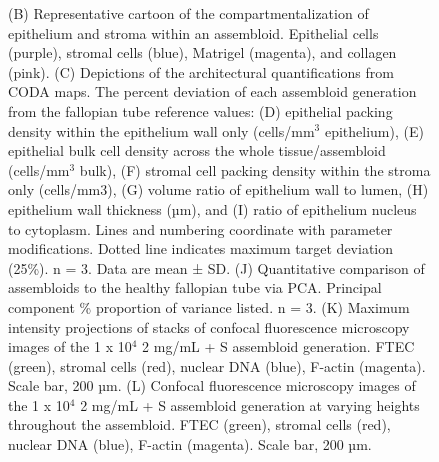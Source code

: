 \begin{refsection}
    \begin{figure}[h!]
        \ContinuedFloat
        \captionsetup{font=small}
        \caption[]{(B) Representative cartoon of the compartmentalization of epithelium and stroma within an assembloid. Epithelial cells (purple), stromal cells (blue), Matrigel (magenta), and collagen (pink). (C) Depictions of the architectural quantifications from CODA maps. The percent deviation of each assembloid generation from the fallopian tube reference values: (D) epithelial packing density within the epithelium wall only (cells/mm$^3$ epithelium), (E) epithelial bulk cell density across the whole tissue/assembloid (cells/mm$^3$ bulk), (F) stromal cell packing density within the stroma only (cells/mm3), (G) volume ratio of epithelium wall to lumen, (H) epithelium wall thickness (µm), and (I) ratio of epithelium nucleus to cytoplasm. Lines and numbering coordinate with parameter modifications. Dotted line indicates maximum target deviation (25\%). n = 3. Data are mean ± SD. (J) Quantitative comparison of assembloids to the healthy fallopian tube via PCA. Principal component \% proportion of variance listed. n = 3. (K) Maximum intensity projections of stacks of confocal fluorescence microscopy images of the 1 x 10$^4$ 2 mg/mL + S assembloid generation. FTEC (green), stromal cells (red), nuclear DNA (blue), F-actin (magenta). Scale bar, 200 µm. (L) Confocal fluorescence microscopy images of the 1 x 10$^4$ 2 mg/mL + S assembloid generation at varying heights throughout the assembloid. FTEC (green), stromal cells (red), nuclear DNA (blue), F-actin (magenta). Scale bar, 200 µm.}
    \end{figure}


\end{refsection}
